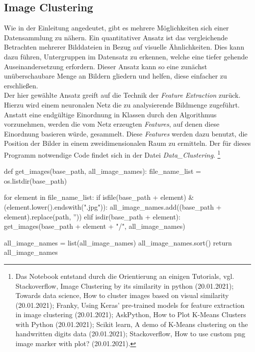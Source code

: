 \documentclass[a4paper,12pt,ngerman]{article}
\begin{document}
\subsection{Image Clustering}

Wie in der Einleitung angedeutet, gibt es mehrere Möglichkeiten sich einer Datensammlung zu nähern. Ein quantitativer Ansatz ist das vergleichende Betrachten mehrerer Bilddateien in Bezug auf visuelle Ähnlichkeiten. Dies kann dazu führen, Untergruppen im Datensatz zu erkennen, welche eine tiefer gehende Auseinandersetzung erfordern. Dieser Ansatz kann so eine zunächst unüberschaubare Menge an Bildern gliedern und helfen, diese einfacher zu erschließen. \\
Der hier gewählte Ansatz greift auf die Technik der \textit{Feature Extraction} zurück. Hierzu wird einem neuronalen Netz die zu analysierende Bildmenge zugeführt. Anstatt eine endgültige Einordnung in Klassen durch den Algorithmus vorzunehmen, werden die vom Netz erzeugten \textit{Features}, auf denen diese Einordnung basieren würde, gesammelt. Diese \textit{Features} werden dazu benutzt, die Position der Bilder in einem zweidimensionalen Raum zu ermitteln. Der für dieses Programm notwendige Code findet sich in der Datei \textit{Data\_Clustering}. \footnote{Das Notebook entstand durch die Orientierung an einigen Tutorials, vgl. Stackoverflow, Image Clustering by its similarity in python (20.01.2021); Towards data science, How to cluster images based on visual similarity (20.01.2021); Franky, Using Keras' pre-trained models for feature extraction in image clustering (20.01.2021); AskPython, How to Plot K-Means Clusters with Python (20.01.2021); Scikit learn, A demo of K-Means clustering on the handwritten digits data (20.01.2021); Stackoverflow, How to use custom png image marker with plot? (20.01.2021).} \\

\begin{python}
	def get_images(base_path, all_image_names):
    file_name_list = os.listdir(base_path)
    
    for element in file_name_list:
        if isfile(base_path + element) & (element.lower().endswith(".jpg")):
            all_image_names.add((base_path + element).replace(path, ''))
        elif isdir(base_path + element):
            get_images(base_path + element + "/", all_image_names)

    all_image_names = list(all_image_names)
    all_image_names.sort()
	return all_image_names
\end{python}
\end{document}

